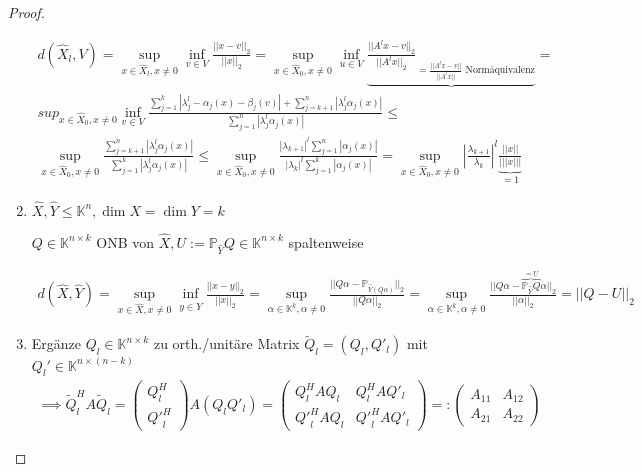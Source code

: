 \begin{proof}
\begin{enumerate}
		\begin{align*}
			d(\hat{X}_l, V) =
			\sup_{x \in \hat{X}_l, x \neq 0} \inf_{v \in V} \frac{||x-v||_2}{||x||_2} =
			\sup_{x \in \hat{X}_0, x\neq 0} \inf_{u \in V} \underbrace{\frac{||A^lx - v||_2}{||A^lx||_2}_{= \frac{||A^lx - v||}{||A^lx||} \text{ Normäquivalenz}}} =\\
			sup_{x \in \hat{X}_0, x\neq 0} \inf_{v \in V} \frac{\sum_{j=1}^{k} |\lambda_j^l - \alpha_j(x) - \beta_j(v)| + \sum_{j=k+1}^{n} |\lambda_j^l \alpha_j(x)| }{\sum_{j=1}^{n} |\lambda_j^l \alpha_j(x)|} \leq\\
			\sup_{x \in \hat{X}_0, x\neq 0} \frac{\sum_{j=k+1}^{n}|\lambda_j^l \alpha_j(x)|}{\sum_{j=1}^{k}|\lambda_j^l \alpha_j(x)|} \leq
			\sup_{x \in \hat{X}_0, x\neq 0} \frac{|\lambda_{k+1}|^l \sum_{j=1}^{n}|\alpha_j(x)|}{|\lambda_k|^l \sum_{j=1}^{k} |\alpha_j(x)|} =
			\sup_{x \in \hat{X}_0, x\neq 0} \left|\frac{\lambda_{k+1}}{\lambda_k}\right|^l \underbrace{\frac{||x||}{|||x|||}}_{= 1}
		\end{align*}
		
		\item $\hat{X}, \hat{Y} \leq \mathbb{K}^n, \dim X=\dim Y = k$
		
		$Q \in \mathbb{K}^{n\times k}$ ONB von $\hat{X}, U := \mathbb{P}_{\hat{Y}}Q \in \mathbb{K}^{n\times k}$ spaltenweise
		
		\begin{align*}
			d(\hat{X}, \hat{Y}) = \sup_{x \in \hat{X}, x \neq 0} \inf_{y \in \hat{Y}} \frac{||x-y||_2}{||x||_2} =
			\sup_{\alpha \in \mathbb{K}^k, \alpha \neq 0} \frac{||Q\alpha - \mathbb{P}_{\hat{Y}(Q\alpha)}||_2}{||Q\alpha||_2} = \sup_{\alpha \in \mathbb{K}^k, \alpha \neq 0} \frac{||Q\alpha - \overbrace{\mathbb{P}_{\hat{Y}}Q}^{=U}\alpha||_2}{||\alpha||_2} = ||Q - U||_2
		\end{align*}
		
		\item Ergänze $Q_l \in \mathbb{K}^{n\times k}$ zu orth./unitäre Matrix $\tilde{Q}_l = (Q_l, Q'_l)$ mit $Q_l' \in \mathbb{K}^{n\times(n-k)}$
		\begin{align*}
			\implies \tilde{Q}_l^HA\tilde{Q}_l = \left(\begin{matrix}
				Q_l^H\\
				{Q'}_l^H
			\end{matrix}\right)A (Q_l Q'_l) =
			\left(\begin{matrix}
				Q_l^HAQ_l & Q_l^HAQ'_l\\
				{Q'}_l^HAQ_l & {Q'}_l^HAQ'_l
			\end{matrix}\right) =: \left(\begin{matrix}
				A_{11} & A_{12}\\
				A_{21} & A_{22}
			\end{matrix}\right)
		\end{align*}
		

\end{enumerate}
\end{proof}
